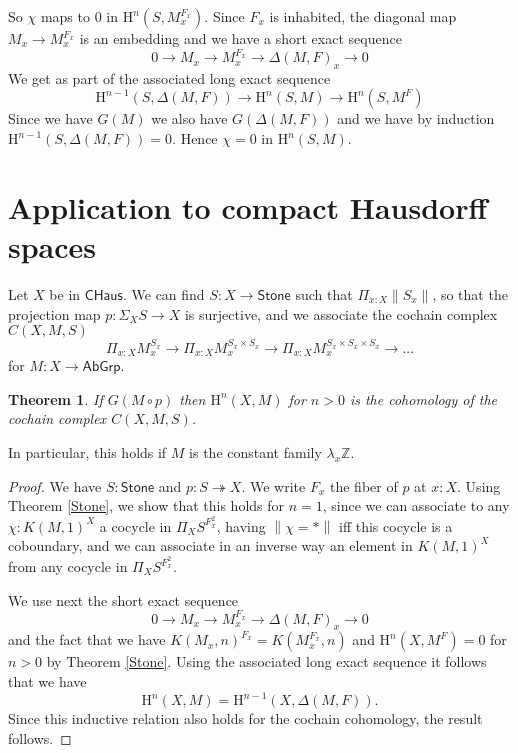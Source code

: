 \documentclass[10pt,a4paper]{article}
\newtheorem{theorem}{Theorem}[section]
\newcommand\HH{\mathrm{H}}
\newcommand{\ints}{\mathbb{Z}}
\newcommand{\Stone}{\mathsf{Stone}}
\newcommand{\CHaus}{\mathsf{CHaus}}
\newcommand{\Ab}{\mathsf{AbGrp}}
\newcommand{\ras}{\twoheadrightarrow}
\newcommand\norm[1]{\left\lVert #1 \right\rVert}
\begin{document}
So $\chi$ maps to $0$ in $\HH^n(S,M_x^{F_x})$. Since $F_x$ is inhabited,
the diagonal map $M_x\rightarrow M_x^{F_x}$ is an embedding and we have a
short exact sequence
\[
0\rightarrow M_x\rightarrow M_x^{F_x}\rightarrow \Delta(M,F)_x\rightarrow 0
\]
We get as part of the associated long exact sequence
\[
\HH^{n-1}(S,\Delta(M,F)) \rightarrow \HH^n(S,M)\rightarrow \HH^n(S,M^F)
\]
Since we have $G(M)$ we also have $G(\Delta(M,F))$ and we have
by induction $\HH^{n-1}(S,\Delta(M,F)) = 0$. Hence $\chi = 0$ in $\HH^n(S,M)$.

\section{Application to compact Hausdorff spaces}

Let $X$ be in $\CHaus$. We can find $S:X\rightarrow\Stone$ such that $\Pi_{x:X}\norm{S_x}$, so that  the projection map
$p:\Sigma_XS\rightarrow X$ is surjective, and we associate the
cochain complex $C(X,M,S)$
\[
\Pi_{x:X}M_x^{S_x}\rightarrow \Pi_{x:X}M_x^{S_x\times S_x}\rightarrow \Pi_{x:X}M_x^{S_x\times S_x\times S_x}\rightarrow \dots
\]
for $M:X\rightarrow\Ab$.

\begin{theorem}
  If $G(M\circ p)$ then $\HH^n(X,M)$ for $n>0$ is the cohomology of the cochain complex $C(X,M,S)$.
\end{theorem}

 In particular, this holds if $M$ is the constant family $\lambda_x \ints$.

 \begin{proof}
   We have $S:\Stone$ and $p:S\ras X$. We write $F_x$ the fiber of $p$ at $x:X$.
   Using Theorem \ref{Stone}, we show that this holds for $n=1$, since we can associate
   to any $\chi:K(M,1)^X$ a cocycle in $\Pi_XS^{F_x^2}$, having $\norm{\chi = *}$ iff this
   cocycle is a coboundary, and we can associate in an inverse way an element in $K(M,1)^X$ from any
   cocycle in $\Pi_XS^{F_x^2}$.
   
   We use next the short exact sequence
\[
0\rightarrow M_x\rightarrow M_x^{F_x}\rightarrow \Delta(M,F)_x\rightarrow 0
\]
and the fact that we have $K(M_x,n)^{F_x} = K(M_x^{F_x},n)$
and $\HH^n(X,M^F) = 0$ for $n>0$ by Theorem \ref{Stone}.
Using the associated long exact sequence it follows that we have
\[
\HH^n(X,M) = \HH^{n-1}(X,\Delta(M,F)).
\]
Since this inductive relation also holds for the cochain cohomology, the result follows.
 \end{proof}
 
\end{document}
